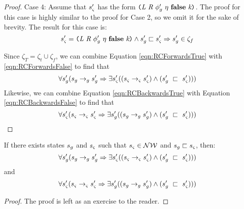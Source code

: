 \begin{proof}
Case 4: Assume that $s_{\varsigma}^\prime$ has the form $\lp \cfgnt{L}\ \cfgnt{R}\ \phi_g^\prime\ \eta\ \cfgt{false}\ \cfgnt{k}\rp $.
The proof for this case is highly similar to the proof for Case 2, so we omit it for the sake of brevity. The result for this case is:
\begin{equation}
\label{eqn:RCBackwardsFalse}
s_\sym^\prime=\lp \cfgnt{L}\ \cfgnt{R}\ \phi_g^\prime\ \eta\ \cfgt{false}\ \cfgnt{k}\rp \wedge s_\gse^\prime \sqsubset s_\sym^\prime \Rightarrow s_\gse^\prime \in \zeta_f
\end{equation}

Since $\zeta_T = \zeta_t \cup \zeta_f$, we can combine Equation \ref{eqn:RCForwardsTrue} with \ref{eqn:RCForwardsFalse} to find that 
\begin{equation}
\forall s_{g}^\prime ( s_{g} \rightarrow_{g} s_{g}^\prime \Rightarrow \exists s_{\varsigma}^\prime( (s_{\varsigma} \rightarrow_{\varsigma} s_{\varsigma}^\prime )\wedge (s_{g}^\prime\ \sqsubset\ s_{\varsigma}^\prime ))  )
\end{equation}
Likewise, we can combine Equation \ref{eqn:RCBackwardsTrue} with Equation \ref{eqn:RCBackwardsFalse} to find that
\begin{equation}
\forall s_{\varsigma}^\prime ( s_{\varsigma} \rightarrow_{\varsigma} s_{\varsigma}^\prime\Rightarrow \exists s_{g}^\prime( (s_{g} \rightarrow_{g} s_{g}^\prime )\wedge (s_{g}^\prime\ \sqsubset\ s_{\varsigma}^\prime ))  )
\end{equation}
\end{proof}

\begin{lemma}
\label{lem:new}
If there exists states $s_{g}$ and $s_{\varsigma}$ such that $s_{\varsigma} \in \mathcal{NW}$ and $s_{g} \sqsubset s_{\varsigma}$, then:
\begin{equation}
\forall s_{g}^\prime ( s_{g} \rightarrow_{g} s_{g}^\prime \Rightarrow \exists s_{\varsigma}^\prime( (s_{\varsigma} \rightarrow_{\varsigma} s_{\varsigma}^\prime )\wedge (s_{g}^\prime\ \sqsubset\ s_{\varsigma}^\prime ))  )
\end{equation}
and
\begin{equation}
\forall s_{\varsigma}^\prime ( s_{\varsigma} \rightarrow_{\varsigma} s_{\varsigma}^\prime\Rightarrow \exists s_{g}^\prime( (s_{g} \rightarrow_{g} s_{g}^\prime )\wedge (s_{g}^\prime\ \sqsubset\ s_{\varsigma}^\prime ))  )
\end{equation}

\begin{proof}
The proof is left as an exercise to the reader.
\end{proof}

\end{lemma}

